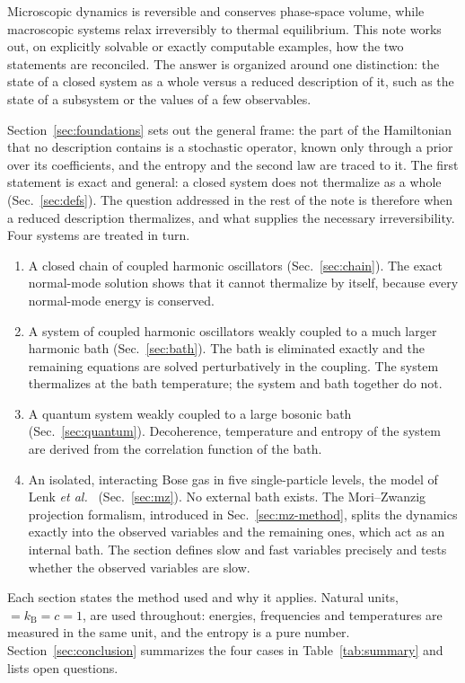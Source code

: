 \documentclass[10pt,a4paper]{article}
\begin{document}
Microscopic dynamics is reversible and conserves phase-space volume, while macroscopic systems relax irreversibly to thermal equilibrium.
This note works out, on explicitly solvable or exactly computable examples, how the two statements are reconciled.
The answer is organized around one distinction: the state of a closed system as a whole versus a reduced description of it, such as the state of a subsystem or the values of a few observables.

Section~\ref{sec:foundations} sets out the general frame: the part of the Hamiltonian that no description contains is a stochastic operator, known only through a prior over its coefficients, and the entropy and the second law are traced to it.
The first statement is exact and general: a closed system does not thermalize as a whole (Sec.~\ref{sec:defs}).
The question addressed in the rest of the note is therefore when a reduced description thermalizes, and what supplies the necessary irreversibility.
Four systems are treated in turn.
\begin{enumerate}[label=(\roman*), leftmargin=2.2em]
\item A closed chain of coupled harmonic oscillators (Sec.~\ref{sec:chain}). The exact normal-mode solution shows that it cannot thermalize by itself, because every normal-mode energy is conserved.
\item A system of coupled harmonic oscillators weakly coupled to a much larger harmonic bath (Sec.~\ref{sec:bath}). The bath is eliminated exactly and the remaining equations are solved perturbatively in the coupling. The system thermalizes at the bath temperature; the system and bath together do not.
\item A quantum system weakly coupled to a large bosonic bath (Sec.~\ref{sec:quantum}). Decoherence, temperature and entropy of the system are derived from the correlation function of the bath.
\item An isolated, interacting Bose gas in five single-particle levels, the model of Lenk \textit{et al.}~\cite{Lenk2025} (Sec.~\ref{sec:mz}). No external bath exists. The Mori--Zwanzig projection formalism, introduced in Sec.~\ref{sec:mz-method}, splits the dynamics exactly into the observed variables and the remaining ones, which act as an internal bath. The section defines slow and fast variables precisely and tests whether the observed variables are slow.
\end{enumerate}
Each section states the method used and why it applies.
Natural units, $ = k_{\mathrm{B}} = c = 1 $, are used throughout: energies, frequencies and temperatures are measured in the same unit, and the entropy is a pure number.
Section~\ref{sec:conclusion} summarizes the four cases in Table~\ref{tab:summary} and lists open questions.
\end{document}
